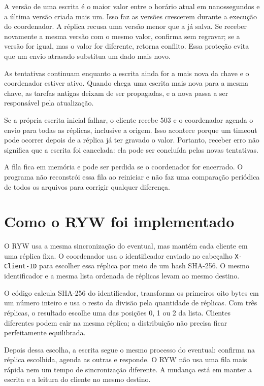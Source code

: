 A versão de uma escrita é o maior valor entre o horário atual em nanossegundos
e a última versão criada mais um. Isso faz as versões crescerem durante a
execução do coordenador. A réplica recusa uma versão menor que a já salva.
Se receber novamente a mesma versão com o mesmo valor, confirma sem regravar;
se a versão for igual, mas o valor for diferente, retorna conflito.
Essa proteção evita que um envio atrasado substitua um dado mais novo.

As tentativas continuam enquanto a escrita ainda for a mais nova da chave
e o coordenador estiver ativo. Quando chega uma escrita mais nova para a
mesma chave, as tarefas antigas deixam de ser propagadas, e a nova passa
a ser responsável pela atualização.

Se a própria escrita inicial falhar, o cliente recebe 503 e o coordenador
agenda o envio para todas as réplicas, inclusive a origem. Isso acontece
porque um timeout pode ocorrer depois de a réplica já ter gravado o valor.
Portanto, receber erro não significa que a escrita foi cancelada: ela pode
ser concluída pelas novas tentativas.

A fila fica em memória e pode ser perdida se o coordenador for encerrado.
O programa não reconstrói essa fila ao reiniciar e não faz uma comparação
periódica de todos os arquivos para corrigir qualquer diferença.

\section{Como o RYW foi implementado}
O RYW usa a mesma sincronização do eventual, mas mantém cada cliente em uma
réplica fixa. O coordenador usa o identificador enviado no cabeçalho
\texttt{X-Client-ID} para escolher essa réplica por meio de um hash SHA-256.
O mesmo identificador e a mesma lista ordenada de réplicas levam ao mesmo destino.

O código calcula SHA-256 do identificador, transforma os primeiros oito bytes
em um número inteiro e usa o resto da divisão pela quantidade de réplicas.
Com três réplicas, o resultado escolhe uma das posições 0, 1 ou 2 da lista.
Clientes diferentes podem cair na mesma réplica; a distribuição não precisa
ficar perfeitamente equilibrada.

Depois dessa escolha, a escrita segue o mesmo processo do eventual: confirma
na réplica escolhida, agenda as outras e responde. O RYW não usa uma fila
mais rápida nem um tempo de sincronização diferente. A mudança está em
manter a escrita e a leitura do cliente no mesmo destino.

